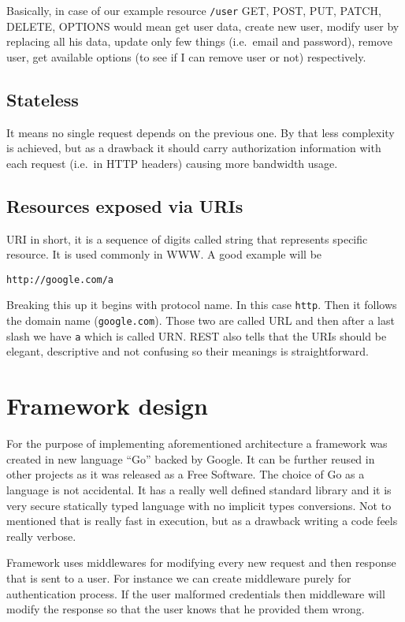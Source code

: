Basically, in case of our example resource \verb|/user| GET, POST, PUT, PATCH, DELETE, OPTIONS would mean get user data, create new user, modify user by replacing all his data, update only few things (i.e.\ email and password), remove user, get available options (to see if I can remove user or not) respectively.

\subsection{Stateless}
\label{sec:stateless}
It means no single request depends on the previous one. By that less complexity is achieved, but as a drawback it should carry authorization information with each request (i.e.\ in HTTP headers) causing more bandwidth usage.

\subsection{Resources exposed via URIs}
\label{sec:resources}
URI\cite{URI-wiki} in short, it is a sequence of digits called string that represents specific resource. It is used commonly in WWW\@. A good example will be
\begin{verbatim}
http://google.com/a
\end{verbatim}
Breaking this up it begins with protocol name. In this case \verb|http|. Then it follows the domain name (\verb|google.com|). Those two are called URL and then after a last slash we have \verb|a| which is called URN\@. REST also tells that the URIs should be elegant, descriptive and not confusing so their meanings is straightforward.

\section{Framework design}
For the purpose of implementing aforementioned architecture a framework was created in new language ``Go'' backed by Google\cite{Go-wiki}. It can be further reused in other projects as it was released as a Free Software. The choice of Go as a language is not accidental. It has a really well defined standard library and it is very secure statically typed language with no implicit types conversions. Not to mentioned that is really fast in execution, but as a drawback writing a code feels really verbose.

Framework uses middlewares for modifying every new request and then response that is sent to a user. For instance we can create middleware purely for authentication process. If the user malformed credentials then middleware will modify the response so that the user knows that he provided them wrong.

